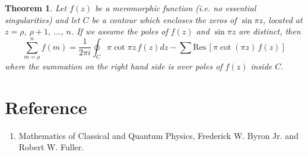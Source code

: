 \documentclass[11pt, letterpaper]{article}
\newtheorem{thm}{Theorem}
\begin{document}
\begin{thm}
Let $f(z)$ be a meromorphic function (i.e. no essential singularities) and let $C$ be a contour which encloses
the zeros of $\sin\pi z$, located at $z=\rho$, $\rho+1$, $\ldots$, $n$. If we assume the poles of $f(z)$ and
$\sin\pi z$ are distinct, then
\begin{equation}
	\sum_{m=\rho}^n f(m) = \frac{1}{2\pi i}\oint_C \pi\cot\pi z\,f(z)dz 
			- \sum\mbox{Res}\,\left[\pi\cot(\pi z)\,f(z)\right]
\end{equation}
where the summation on the right hand side is over poles of $f(z)$ inside $C$.
\end{thm}


\section{Reference}
\begin{enumerate}
	\item Mathematics of Classical and Quantum Physics, Frederick W. Byron Jr. and Robert W. Fuller.
\end{enumerate}
\end{document}
